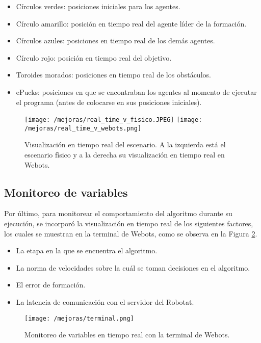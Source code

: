\begin{itemize}
	\item Círculos verdes: posiciones iniciales para los agentes.
	\item Círculo amarillo: posición en tiempo real del agente líder de la formación.
	\item Círculos azules: posiciones en tiempo real de los demás agentes.
	\item Círculo rojo: posición en tiempo real del objetivo.
	\item Toroides morados: posiciones en tiempo real de los obstáculos.
	\item ePucks: posiciones en que se encontraban los agentes al momento de ejecutar el programa (antes de colocarse en sus posiciones iniciales).
\end{itemize}

\begin{figure}[H]
	\centering
	\texttt{[image: /mejoras/real\_time\_v\_fisico.JPEG]}
	\texttt{[image: /mejoras/real\_time\_v\_webots.png]}
	\caption{Visualización en tiempo real del escenario. A la izquierda está el escenario físico y a la derecha su visualización en tiempo real en Webots.}
	\label{fig:visualizacion}
\end{figure}

\subsection{Monitoreo de variables}
Por último, para monitorear el comportamiento del algoritmo durante su ejecución, se incorporó la visualización en tiempo real de los siguientes factores, los cuales se muestran en la terminal de Webots, como se observa en la Figura \ref{fig:variables}.

\begin{itemize}
	\item La etapa en la que se encuentra el algoritmo.
	\item La norma de velocidades sobre la cuál se toman decisiones en el algoritmo.
	\item El error de formación.
	\item La latencia de comunicación con el servidor del Robotat.
\end{itemize}

\begin{figure}[H]
	\centering
	\texttt{[image: /mejoras/terminal.png]}
	\caption{Monitoreo de variables en tiempo real con la terminal de Webots.}
	\label{fig:variables}
\end{figure}

